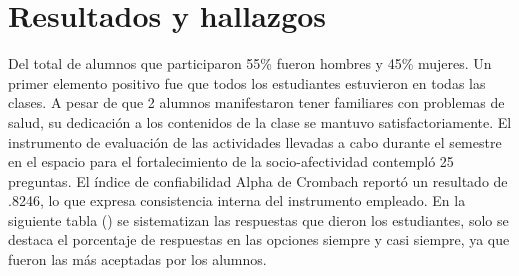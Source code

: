 \documentclass{textolivre}
\begin{document}
\section{Resultados y hallazgos}
Del total de alumnos que participaron 55\% fueron hombres y 45\% mujeres. Un primer elemento positivo fue que todos los estudiantes estuvieron en todas las clases. A pesar de que 2 alumnos manifestaron tener familiares con problemas de salud, su dedicación a los contenidos de la clase se mantuvo satisfactoriamente. El instrumento de evaluación de las actividades llevadas a cabo durante el semestre en el espacio para el fortalecimiento de la socio-afectividad contempló 25 preguntas. El índice de confiabilidad Alpha de Crombach reportó un resultado de .8246, lo que expresa consistencia interna del instrumento empleado. En la siguiente tabla () se sistematizan las respuestas que dieron los estudiantes, solo se destaca el porcentaje de respuestas en las opciones siempre y casi siempre, ya que fueron las más aceptadas por los alumnos.
\end{document}
